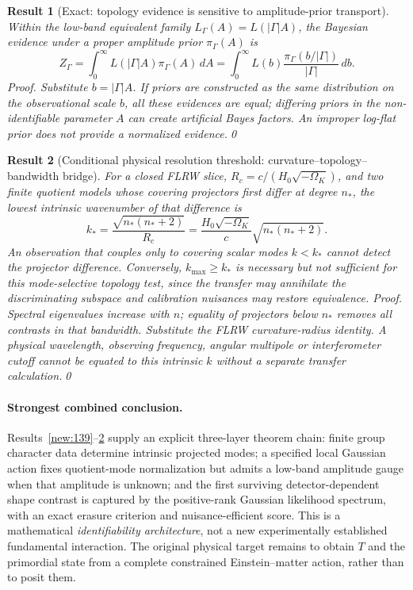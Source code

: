 \documentclass[aps,prd,onecolumn,notitlepage,groupedaddress,11pt]{revtex4-2}
\newtheorem{result}{Result}
\begin{document}
\begin{result}[\textsf{Exact}: topology evidence is sensitive to amplitude-prior transport]\label{new:155}
Within the low-band equivalent family \(L_\Gamma(A)=L(|\Gamma|A)\), the Bayesian evidence under a \emph{proper} amplitude prior \(\pi_\Gamma(A)\) is
\begin{equation}\label{new:eq155}
Z_\Gamma=\int_0^\infty L(|\Gamma|A)\pi_\Gamma(A)\,dA
=\int_0^\infty L(b)\frac{\pi_\Gamma(b/|\Gamma|)}{|\Gamma|}\,db.
\end{equation}
\textit{Proof.} Substitute \(b=|\Gamma|A\). If priors are constructed as the same distribution on the observational scale \(b\), all these evidences are equal; differing priors in the non-identifiable parameter \(A\) can create artificial Bayes factors. An improper log-flat prior does not provide a normalized evidence.\qed
\end{result}
\begin{result}[\textsf{Conditional physical resolution threshold}: curvature--topology--bandwidth bridge]\label{new:156}
For a closed FLRW slice, \(R_c=c/(H_0\sqrt{-\Omega_K})\), and two finite quotient models whose covering projectors first differ at degree \(n_*\), the lowest intrinsic wavenumber of that difference is
\begin{equation}\label{new:eq156}
k_* = \frac{\sqrt{n_*(n_*+2)}}{R_c}
=\frac{H_0\sqrt{-\Omega_K}}c\sqrt{n_*(n_*+2)}.
\end{equation}
An observation that couples \emph{only} to covering scalar modes \(k<k_*\) cannot detect the projector difference. Conversely, \(k_{\max}\ge k_*\) is \emph{necessary but not sufficient} for this mode-selective topology test, since the transfer may annihilate the discriminating subspace and calibration nuisances may restore equivalence.
\textit{Proof.} Spectral eigenvalues increase with \(n\); equality of projectors below \(n_*\) removes all contrasts in that bandwidth. Substitute the FLRW curvature-radius identity. A physical wavelength, observing frequency, angular multipole or interferometer cutoff cannot be equated to this intrinsic \(k\) without a separate transfer calculation.\qed
\end{result}

\paragraph{Strongest combined conclusion.} Results~\ref{new:139}--\ref{new:156} supply an explicit three-layer theorem chain: finite group character data determine intrinsic projected modes; a specified local Gaussian action fixes quotient-mode normalization but admits a low-band amplitude gauge when that amplitude is unknown; and the first surviving detector-dependent shape contrast is captured by the positive-rank Gaussian likelihood spectrum, with an exact erasure criterion and nuisance-efficient score. This is a mathematical \emph{identifiability architecture}, not a new experimentally established fundamental interaction. The original physical target remains to obtain \(T\) and the primordial state from a complete constrained Einstein--matter action, rather than to posit them.
\end{document}
